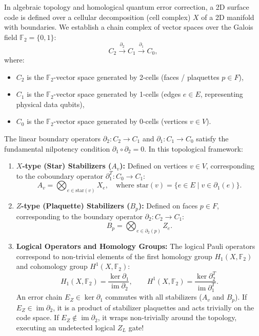 In algebraic topology and homological quantum error correction, a 2D surface code is defined over a cellular decomposition (cell complex) $X$ of a 2D manifold with boundaries. We establish a chain complex of vector spaces over the Galois field $\mathbb{F}_2 = \{0, 1\}$:
\begin{equation}
    C_2 \xrightarrow{\partial_2} C_1 \xrightarrow{\partial_1} C_0,
    \label{eq:homological_chain_complex}
\end{equation}
where:
\begin{itemize}
    \item $C_2$ is the $\mathbb{F}_2$-vector space generated by 2-cells (faces / plaquettes $p \in F$),
    \item $C_1$ is the $\mathbb{F}_2$-vector space generated by 1-cells (edges $e \in E$, representing physical data qubits),
    \item $C_0$ is the $\mathbb{F}_2$-vector space generated by 0-cells (vertices $v \in V$).
\end{itemize}

The linear boundary operators $\partial_2: C_2 \to C_1$ and $\partial_1: C_1 \to C_0$ satisfy the fundamental nilpotency condition $\partial_1 \circ \partial_2 = 0$. In this topological framework:
\begin{enumerate}
    \item \textbf{$X$-type (Star) Stabilizers ($A_v$):} Defined on vertices $v \in V$, corresponding to the coboundary operator $\partial_1^T: C_0 \to C_1$:
    \begin{equation}
        A_v = \bigotimes_{e \in \text{star}(v)} X_e, \quad \text{where } \text{star}(v) = \{e \in E \mid v \in \partial_1(e)\}.
    \end{equation}
    \item \textbf{$Z$-type (Plaquette) Stabilizers ($B_p$):} Defined on faces $p \in F$, corresponding to the boundary operator $\partial_2: C_2 \to C_1$:
    \begin{equation}
        B_p = \bigotimes_{e \in \partial_2(p)} Z_e.
    \end{equation}
    \item \textbf{Logical Operators and Homology Groups:} The logical Pauli operators correspond to non-trivial elements of the first homology group $H_1(X, \mathbb{F}_2)$ and cohomology group $H^1(X, \mathbb{F}_2)$:
    \begin{equation}
        H_1(X, \mathbb{F}_2) = \frac{\ker \partial_1}{\operatorname{im} \partial_2}, \qquad H^1(X, \mathbb{F}_2) = \frac{\ker \partial_2^T}{\operatorname{im} \partial_1^T}.
    \end{equation}
    An error chain $E_Z \in \ker \partial_1$ commutes with all stabilizers ($A_v$ and $B_p$). If $E_Z \in \operatorname{im} \partial_2$, it is a product of stabilizer plaquettes and acts trivially on the code space. If $E_Z \notin \operatorname{im} \partial_2$, it wraps non-trivially around the topology, executing an undetected logical $Z_L$ gate!
\end{enumerate}


